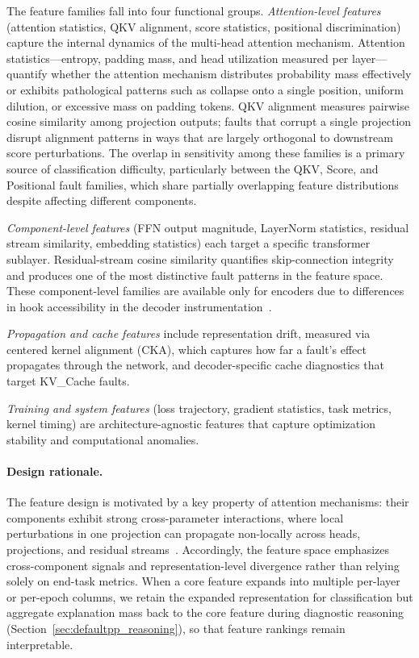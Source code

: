 The feature families fall into four functional groups. \emph{Attention-level features} (attention statistics, QKV alignment, score statistics, positional discrimination) capture the internal dynamics of the multi-head attention mechanism. Attention statistics---entropy, padding mass, and head utilization measured per layer---quantify whether the attention mechanism distributes probability mass effectively or exhibits pathological patterns such as collapse onto a single position, uniform dilution, or excessive mass on padding tokens. QKV alignment measures pairwise cosine similarity among projection outputs; faults that corrupt a single projection disrupt alignment patterns in ways that are largely orthogonal to downstream score perturbations. The overlap in sensitivity among these families is a primary source of classification difficulty, particularly between the QKV, Score, and Positional fault families, which share partially overlapping feature distributions despite affecting different components.

\emph{Component-level features} (FFN output magnitude, LayerNorm statistics, residual stream similarity, embedding statistics) each target a specific transformer sublayer. Residual-stream cosine similarity quantifies skip-connection integrity and produces one of the most distinctive fault patterns in the feature space. These component-level families are available only for encoders due to differences in hook accessibility in the decoder instrumentation~\cite{frankenformer}.

\emph{Propagation and cache features} include representation drift, measured via centered kernel alignment (CKA), which captures how far a fault's effect propagates through the network, and decoder-specific cache diagnostics that target KV\_Cache faults.

\emph{Training and system features} (loss trajectory, gradient statistics, task metrics, kernel timing) are architecture-agnostic features that capture optimization stability and computational anomalies.

\paragraph{Design rationale.}
The feature design is motivated by a key property of attention mechanisms: their components exhibit strong cross-parameter interactions, where local perturbations in one projection can propagate non-locally across heads, projections, and residual streams~\cite{hessian_analysis}. Accordingly, the feature space emphasizes cross-component signals and representation-level divergence rather than relying solely on end-task metrics. When a core feature expands into multiple per-layer or per-epoch columns, we retain the expanded representation for classification but aggregate explanation mass back to the core feature during diagnostic reasoning (Section~\ref{sec:defaultpp_reasoning}), so that feature rankings remain interpretable.

